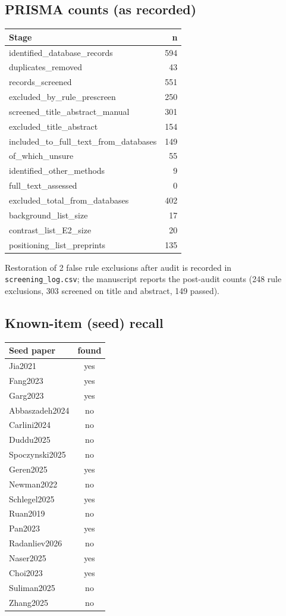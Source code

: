\documentclass[10pt,a4paper]{article}
\begin{document}
\subsection*{PRISMA counts (as recorded)}\begin{tabular}{lr}\toprule Stage & n\\\midrule
identified\_database\_records & 594\\
duplicates\_removed & 43\\
records\_screened & 551\\
excluded\_by\_rule\_prescreen & 250\\
screened\_title\_abstract\_manual & 301\\
excluded\_title\_abstract & 154\\
included\_to\_full\_text\_from\_databases & 149\\
of\_which\_unsure & 55\\
identified\_other\_methods & 9\\
full\_text\_assessed & 0\\
excluded\_total\_from\_databases & 402\\
background\_list\_size & 17\\
contrast\_list\_E2\_size & 20\\
positioning\_list\_preprints & 135\\
\bottomrule\end{tabular}
\par Restoration of 2 false rule exclusions after audit is recorded in \texttt{screening\_log.csv}; the manuscript reports the post-audit counts (248 rule exclusions, 303 screened on title and abstract, 149 passed).
\subsection*{Known-item (seed) recall}\begin{tabular}{lc}\toprule Seed paper & found\\\midrule
Jia2021 & yes\\
Fang2023 & yes\\
Garg2023 & yes\\
Abbaszadeh2024 & no\\
Carlini2024 & no\\
Duddu2025 & no\\
Spoczynski2025 & no\\
Geren2025 & yes\\
Newman2022 & no\\
Schlegel2025 & yes\\
Ruan2019 & no\\
Pan2023 & yes\\
Radanliev2026 & no\\
Naser2025 & yes\\
Choi2023 & yes\\
Suliman2025 & no\\
Zhang2025 & no\\
\bottomrule\end{tabular}
\end{document}
